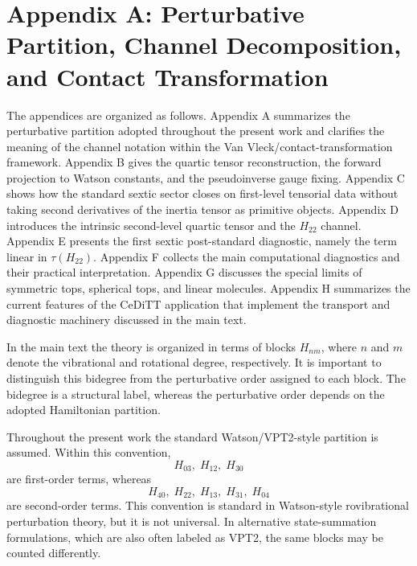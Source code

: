 \documentclass[aip,jcp,reprint,floatfix]{revtex4-2}
\begin{document}
\section{Appendix A: Perturbative Partition, Channel Decomposition, and Contact Transformation}

The appendices are organized as follows.
Appendix A summarizes the perturbative partition adopted throughout the
present work and clarifies the meaning of the channel notation within the
Van Vleck/contact-transformation framework. Appendix B gives the quartic
tensor reconstruction, the forward projection to Watson constants, and the
pseudoinverse gauge fixing. Appendix C shows how the standard sextic sector
closes on first-level tensorial data without taking second derivatives of the
inertia tensor as primitive objects. Appendix D introduces the intrinsic
second-level quartic tensor and the $H_{22}$ channel. Appendix E presents the
first sextic post-standard diagnostic, namely the term linear in
$\tau(H_{22})$. Appendix F collects the main computational diagnostics and
their practical interpretation. Appendix G discusses the special limits of
symmetric tops, spherical tops, and linear molecules. Appendix H summarizes
the current features of the CeDiTT application that implement the transport
and diagnostic machinery discussed in the main text.

In the main text the theory is organized in terms of blocks $H_{nm}$, where
$n$ and $m$ denote the vibrational and rotational degree, respectively. It is
important to distinguish this bidegree from the perturbative order assigned to
each block. The bidegree is a structural label, whereas the perturbative order
depends on the adopted Hamiltonian partition.

Throughout the present work the standard Watson/VPT2-style partition is
assumed. Within this convention,
\begin{equation}
H_{03},\;H_{12},\;H_{30}
\end{equation}
are first-order terms, whereas
\begin{equation}
H_{40},\;H_{22},\;H_{13},\;H_{31},\;H_{04}
\end{equation}
are second-order terms. This convention is standard in Watson-style
rovibrational perturbation theory, but it is not universal. In alternative
state-summation formulations, which are also often labeled as VPT2, the same
blocks may be counted differently.
\end{document}

